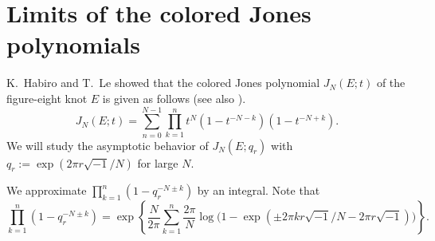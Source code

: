 \documentclass[a4paper]{amsart}
\theoremstyle{plain}
\theoremstyle{definition}
\theoremstyle{remark}
\numberwithin{equation}{section}
\begin{document}
\section{Limits of the colored Jones polynomials}
K.~Habiro \cite{Habiro:SURIK00} and T.~Le showed that the colored Jones
polynomial $J_N(E;t)$ of the figure-eight knot $E$ is given as follows
(see also \cite{Masbaum:AGT03}).
\begin{equation}\label{eq:Jones}
  J_N(E;t)=\sum_{n=0}^{N-1}\prod_{k=1}^{n}
           t^N\left(1-t^{-N-k}\right)\left(1-t^{-N+k}\right).
\end{equation}
We will study the asymptotic behavior of
$J_N(E;q_r)$ with $q_r:=\exp(2\pi{r}\sqrt{-1}/N)$ for large $N$.
\par
We approximate $\prod_{k=1}^{n}\left(1-q_r^{-N{\pm}k}\right)$ by
an integral.
Note that
\begin{equation*}
  \prod_{k=1}^{n}\left(1-q_r^{-N{\pm}k}\right)
  =
  \exp
  \left\{
    \frac{N}{2\pi}
    \sum_{k=1}^{n}
    \frac{2\pi}{N}
    \log\bigl(1-\exp(\pm2\pi{k}{r}\sqrt{-1}/N-2\pi{r}\sqrt{-1})\bigr)
  \right\}.
\end{equation*}
\end{document}
